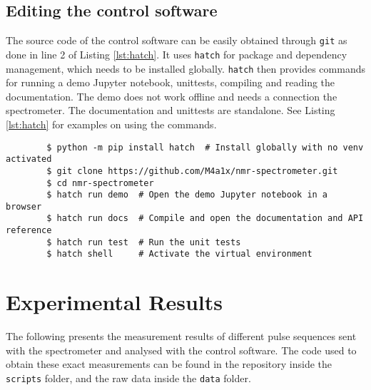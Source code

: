 \section{Editing the control software}
The source code of the control software can be easily obtained through \lstinline{git} as done in line 2 of Listing \ref{lst:hatch}. It uses \lstinline{hatch} for package and dependency management, which needs to be installed globally. \lstinline{hatch} then provides commands for running a demo Jupyter notebook, unittests, compiling and reading the documentation. The demo does not work offline and needs a connection the spectrometer. The documentation and unittests are standalone. See Listing \ref{lst:hatch} for examples on using the commands.

\begin{listing}[h!bt]
    \begin{verbatim}
        $ python -m pip install hatch  # Install globally with no venv activated
        $ git clone https://github.com/M4a1x/nmr-spectrometer.git
        $ cd nmr-spectrometer
        $ hatch run demo  # Open the demo Jupyter notebook in a browser
        $ hatch run docs  # Compile and open the documentation and API reference
        $ hatch run test  # Run the unit tests
        $ hatch shell     # Activate the virtual environment
    \end{verbatim}
    \caption{. The invoked commands can be found in the \lstinline{pyprojects.toml} file in the repository. Examples for using the library are available in the \lstinline{scripts} and \lstinline{docs} folders.}
    \label{lst:hatch}
\end{listing}

\chapter{Experimental Results}
The following presents the measurement results of different pulse sequences sent with the spectrometer and analysed with the control software. The code used to obtain these exact measurements can be found in the repository inside the \lstinline{scripts} folder, and the raw data inside the \lstinline{data} folder.

